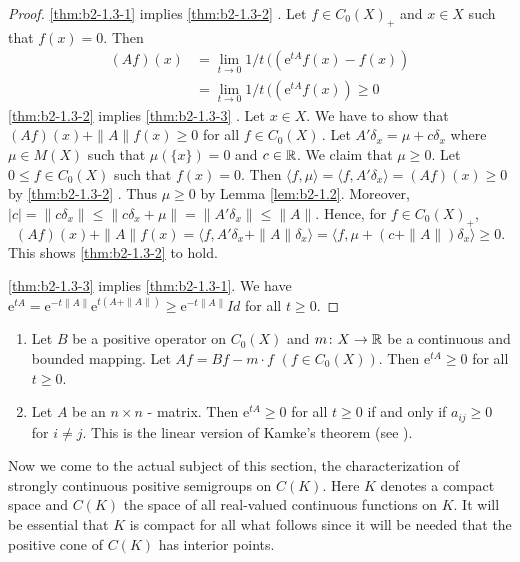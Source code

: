 \begin{proof}
\ref{thm:b2-1.3-1} implies \ref{thm:b2-1.3-2} .
Let $f \in C_{0}(X)_{+}$ and $x \in X$ such that $f(x) = 0$.
Then
\begin{align*}
(Af)(x) &= \lim_{t \to 0} 1/t\, ((\mathrm{e}^{tA}f(x) - f(x)) \\
&= \lim_{t \to 0} 1/t\, ((\mathrm{e}^{tA}f(x)) \geq 0
\end{align*}
\ref{thm:b2-1.3-2} implies \ref{thm:b2-1.3-3} .
Let $x \in X$.
We have to show that $(Af)(x) + \|A\|f(x) \geq 0$ for all $f \in C_{0}(X)$\,.
Let $A'\delta_{x} = \mu + c\delta_{x}$ where $\mu \in M(X)$ such that $\mu(\{x\}) = 0$ and $c \in \mathbb{R}$.
We claim that $\mu \geq 0$.
Let $0 \leq f \in C_{0}(X)$ such that $f(x) = 0$.
Then $\langle f,\mu \rangle = \langle f,A'\delta_{x} \rangle = (Af)(x) \geq 0$ by \ref{thm:b2-1.3-2} .
Thus $\mu \geq 0$ by Lemma \ref{lem:b2-1.2}.
Moreover, $|c| = \|c\delta_{x}\| \leq \|c\delta_{x} + \mu\| = \|A'\delta_{x}\| \leq \|A\|$.
Hence, for $f \in C_{0}(X)_{+}$,
\[
(Af)(x) + \|A\|f(x) = \langle f, A'\delta_{x} + \|A\|\delta_{x} \rangle = \langle f, \mu + (c+\|A\|)\delta_{x} \rangle \geq 0.
\]
This shows  \ref{thm:b2-1.3-2} to hold.

\ref{thm:b2-1.3-3} implies \ref{thm:b2-1.3-1}.
We have 
$\mathrm{e}^{tA} = \mathrm{e}^{-t\|A\|}\mathrm{e}^{t(A+\|A\|)} \geq \mathrm{e}^{-t\|A\|}Id$ for all $t \geq 0$.
\end{proof}

\begin{example}\label{ex:b2-1.4} 
 
	\begin{enumerate}[\upshape (i), wide, labelindent=.5ex] 
		\item \label{ex:b2-1.4-1}
		Let $B$ be a positive operator on $C_{0}(X)$ and $m \colon X \to \mathbb{R}$ be a continuous and bounded mapping.
		Let $Af = Bf - m \cdot f$ $(f \in C_{0}(X))$.
		Then $\mathrm{e}^{tA} \geq 0$ for all $t \geq 0$.
		
		\item \label{ex:b2-1.4-2}
		Let $A$ be an $n \times n$ - matrix.
		Then $\mathrm{e}^{tA} \geq 0$ for all $t \geq 0$ if and only if $a_{ij} \geq 0$ for $i \neq j$.
		This is the linear version of Kamke's theorem (see \citet{kamke:1932}).
    \end{enumerate}
\end{example}

Now we come to the actual subject of this section, the characterization of strongly continuous positive semigroups on $C(K)$.
Here $K$
denotes a compact space and $C(K)$ the space of all real-valued continuous functions on $K$.
It will be essential that $K$ is compact for all what follows since it will be needed that the positive cone of $C(K)$ has interior points.


